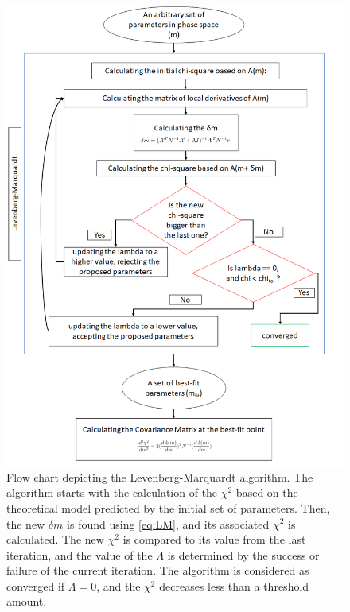 \documentclass[12pt, TexShade, letterpaper]{report}
\begin{document}
\begin{figure}[h!]
\centering
\includegraphics[scale =0.7]{LM_flow.png}
\caption[Flow chart of \gls{lm}]{Flow chart depicting the Levenberg-Marquardt algorithm. The algorithm starts with the calculation of the $\chi^2$ based on the theoretical model predicted by the initial set of parameters. Then, the new $\delta m$ is found using \ref{eq:LM}, and its associated $\chi^2$ is calculated. The new $\chi^2$ is compared to its value from the last iteration, and the value of the $\Lambda$ is determined by the success or failure of the current iteration. The algorithm is considered as converged if $\Lambda = 0$, and the $\chi^2$ decreases less than a threshold amount.}
\label{fig:LM_flow}
\end{figure}
\end{document}
